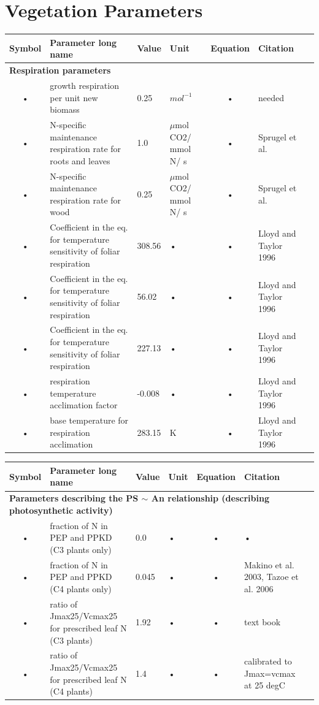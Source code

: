 \documentclass[11pt,oneside,openright,a4paper,fleqn]{book}  %
\begin{document}
\begin{table}
\section{Vegetation Parameters}\label{tab:veg:param}

\begin{tabularx}{\linewidth}{|c|X|l|l|c|l|c|} %
\hline 
Symbol & Parameter long name & Value & Unit & Equation & Citation \\
\hline 

\multicolumn{6}{l}{\bf Respiration parameters}\\
\hline
• & growth respiration per unit new biomass & 0.25 & $mol^{-1}$ & • & needed \\
• & N-specific maintenance respiration rate for roots and leaves & 1.0 & $\mu$mol CO2/ mmol N/ s & • & Sprugel et al. \\
• & N-specific maintenance respiration rate for wood & 0.25 & $\mu$mol CO2/ mmol N/ s & • & Sprugel et al. \\
• & Coefficient in the eq. for temperature sensitivity of foliar respiration & 308.56 & • & • & Lloyd and Taylor 1996 \\ 
• & Coefficient in the eq. for temperature sensitivity of foliar respiration & 56.02 & • & • & Lloyd and Taylor 1996 \\ 
• & Coefficient in the eq. for temperature sensitivity of foliar respiration & 227.13 & • & • & Lloyd and Taylor 1996 \\ 
• & respiration temperature acclimation factor & -0.008 & • & • & Lloyd and Taylor 1996 \\
• & base temperature for respiration acclimation & 283.15 & K & • & Lloyd and Taylor 1996 \\

\hline
\end{tabularx}
\end{table}


\begin{table}
\begin{tabularx}{\linewidth}{|c|X|l|l|c|l|c|} %
\hline 
Symbol & Parameter long name & Value & Unit & Equation & Citation \\
\hline

\multicolumn{6}{l}{\bf Parameters describing the PS $\sim$ An relationship (describing photosynthetic activity)}\\
\hline
• & fraction of N in PEP and PPKD (C3 plants only) & 0.0 & • & • & • \\
• & fraction of N in PEP and PPKD (C4 plants only) & 0.045 & • & • & Makino et al. 2003, Tazoe et al. 2006 \\
• & ratio of Jmax25/Vcmax25 for prescribed leaf N (C3 plants) & 1.92 & • & • & text book \\
• & ratio of Jmax25/Vcmax25 for prescribed leaf N (C4 plants) & 1.4 & • & • & calibrated to Jmax=vcmax at 25 degC \\

\hline
\end{tabularx}
\end{table}
\end{document}
